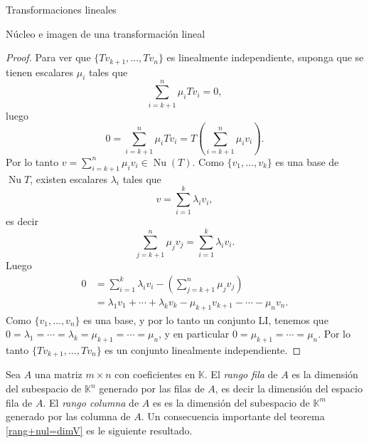 \documentclass[a4paper,12pt,twoside,spanish,reqno]{amsbook}
\numberwithin{equation}{section}
\theoremstyle{definition}
\theoremstyle{remark}
\newcommand{\nuc}{\operatorname{Nu}}
\newcommand{\K}{\mathbb K}
\begin{document}
\begin{chapter}{Transformaciones lineales}
\begin{section}{Núcleo e imagen de una transformación lineal}
\begin{proof}
             Para ver que  $\{Tv_{k+1},\ldots,Tv_n \}$ es linealmente independiente, suponga que se tienen escalares $\mu_i$ tales que
             $$
             \sum_{i=k+1}^n \mu_i Tv_i = 0,
             $$
             luego
             $$
             0 = \sum_{i=k+1}^n \mu_i Tv_i =   T(\sum_{i=k+1}^n\mu_iv_i).  
             $$
             Por lo tanto $v =\sum_{i=k+1}^n \mu_iv_i\in \nuc(T)$. Como  $\{v_1,\ldots,v_k \}$ es una base de $\nuc T$,  existen escalares $\lambda_i$ tales que
             $$
             v =  \sum_{i=1}^k \lambda_i v_i,
             $$
             es decir
             $$
             \sum_{j=k+1}^n \mu_jv_j =  \sum_{i=1}^k \lambda_i v_i.
             $$
             Luego
             \begin{align*}
                     0 &= \sum_{i=1}^k \lambda_i v_i - (\sum_{j=k+1}^n \mu_jv_j) \\
                     &= \lambda_1 v_1 + \cdots +\lambda_k v_k - \mu_{k+1}v_{k+1} -\cdots-\mu_nv_n.
             \end{align*}
             Como $\{v_1,\ldots,v_n \}$ es una base, y por lo tanto un conjunto LI,  tenemos que  $0=\lambda_1=\cdots=\lambda_k=\mu_{k+1}=\cdots=\mu_n$, y  en particular $0=\mu_{k+1}=\cdots=\mu_n$. Por lo tanto $\{Tv_{k+1},\ldots,Tv_n \}$ es un conjunto linealmente independiente.		  
        \end{proof}
        
    
        
        Sea $A$ una matriz $m \times n$ con coeficientes  en $\K$. El  \textit{rango fila} de $A$ es la dimensión del subespacio de $\K^n$ generado por las filas de $A$, es decir la dimensión del espacio fila de $A$. El \textit{rango columna} de $A$  es es la dimensión del subespacio de $\K^m$ generado por las columna de $A$. Un  consecuencia importante del teorema \ref{rang+nul=dimV} es le siguiente resultado. 
        

\end{section}
\end{chapter}
\end{document}
